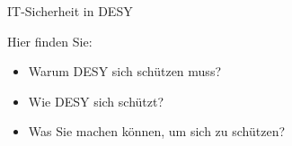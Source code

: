 \documentclass[final]{beamer}
\begin{document}
\begin{frame}[t]
\begin{columns}[t]
\begin{column}{0.95\textwidth}
\begin{block}{IT-Sicherheit in DESY}
\end{block}

\begin{block}{Hier finden Sie:}

\begin{center}
\begin{itemize}
    \item Warum DESY sich schützen muss?
    \item Wie DESY sich schützt?
    \item Was Sie machen können, um sich zu schützen?
\end{itemize}
\end{center}

\end{block}

\end{column}

\end{columns} %


\end{frame} %
\end{document}
